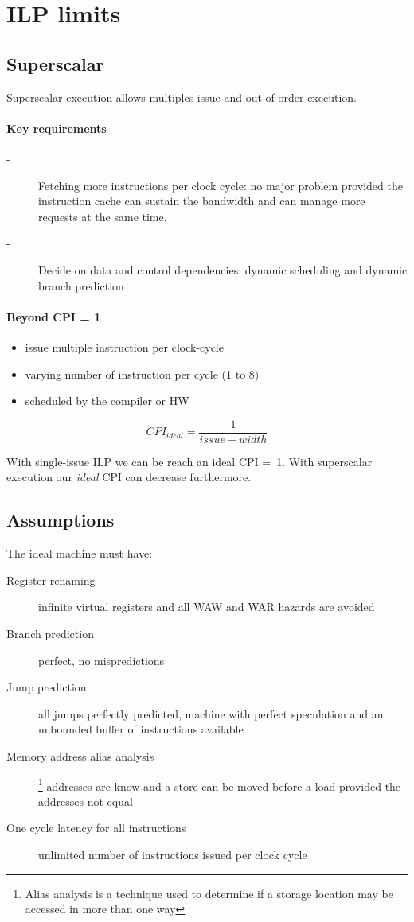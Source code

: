 \section{ILP limits}\label{sec:ilp-limits}
\subsection{Superscalar}\label{subsec:superscalar}
Superscalar execution allows multiples-issue and out-of-order execution.

\paragraph{Key requirements}
\begin{description}
    \item[-] Fetching more instructions per clock cycle: no major problem provided the instruction cache can sustain
    the bandwidth and can manage more requests at the same time.
    \item[-] Decide on data and control dependencies: dynamic scheduling and dynamic branch prediction
\end{description}

\paragraph{Beyond CPI = 1} 
\begin{itemize}[noitemsep]
    \item issue multiple instruction per clock-cycle
    \item varying number of instruction per cycle (1 to 8)
    \item scheduled by the compiler or HW
\end{itemize}
\[CPI_{ideal} =\frac{1}{issue-width}\]


With single-issue ILP we can be reach an ideal CPI =~1.
With superscalar execution our \textit{ideal} CPI can decrease furthermore.

\subsection{Assumptions}\label{subsec:assumptions}
The ideal machine must have:
\begin{description}
    \item[Register renaming] infinite virtual registers and all WAW and WAR hazards are avoided
    \item[Branch prediction] perfect, no mispredictions
    \item[Jump prediction] all jumps perfectly predicted, machine with perfect speculation and an unbounded buffer of
    instructions available
    \item[Memory address alias analysis]\footnote{Alias analysis is a technique used to determine if a storage location may be accessed in more than one way} addresses are know and a store can be moved before a load provided the 
    addresses not equal 
    \item[One cycle latency for all instructions] unlimited number of instructions issued per clock cycle
\end{description}

